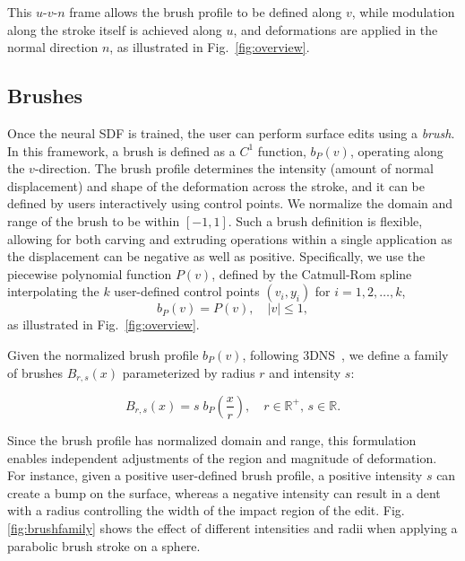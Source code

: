 This \(u\)-\(v\)-\(n\) frame allows the brush profile to be defined along \(v\), while modulation along the stroke itself is achieved along \(u\), and deformations are applied in the normal direction \(n\), as illustrated in Fig.~\ref{fig:overview}.

\subsection{Brushes}

Once the neural SDF is trained, the user can perform surface edits using a \textit{brush}. In this framework, a brush is defined as a \(C^1\) function, \(b_P(v)\), operating along the \(v\)-direction. The brush profile determines the intensity (amount of normal displacement) and shape of the deformation across the stroke, and it can be defined by users interactively using control points. We normalize the domain and range of the brush to be within $[-1, 1]$. Such a brush definition is flexible, allowing for both carving and extruding operations within a single application as the displacement can be negative as well as positive. Specifically, we use the piecewise polynomial function \(P(v)\), defined by the Catmull-Rom spline \cite{catmull1974class} interpolating the $k$ user-defined control points \((v_i, y_i)\) for \(i = 1, 2, \ldots, k\),
\begin{equation}
b_P(v)=P(v), \quad |v| \le 1,
\end{equation}
as illustrated in Fig.~\ref{fig:overview}.

Given the normalized brush profile \(b_P(v)\), following 3DNS~\cite{tzathas20233d}, we define a family of brushes \(B_{r,s}(x)\) parameterized by radius \(r\) and intensity \(s\):

\begin{equation}
B_{r,s}(x) = s \; b_P\left( \frac{x}{r} \right), \quad r \in \mathbb{R}^+, \, s \in \mathbb{R}.
\end{equation}


Since the brush profile has normalized domain and range, this formulation enables independent adjustments of the region and magnitude of deformation. For instance, given a positive user-defined brush profile, a positive intensity \(s\) can create a bump on the surface, whereas a negative intensity can result in a dent with a radius controlling the width of the impact region of the edit. Fig. \ref{fig:brushfamily} shows the effect of different intensities and radii when applying a parabolic brush stroke on a sphere. 


